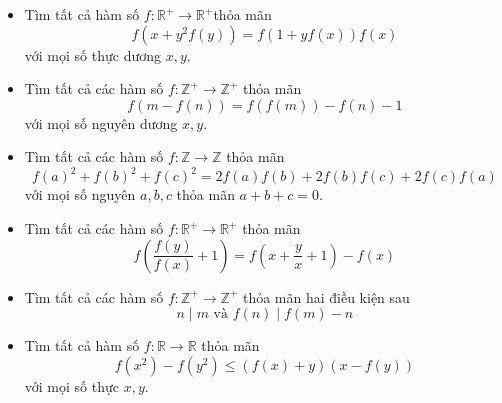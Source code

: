 \documentclass[11pt]{scrartcl}
\begin{document}
\begin{itemize}[label=, leftmargin=0em, itemsep=0.5em]
\begin{sol}
        
        
       \end{sol}
    \item \begin{bt}
        Tìm tất cả hàm số $f: \mathbb{R}^{+} \rightarrow \mathbb{R}^{+}$thỏa mãn
        $$
        f\left(x+y^2 f(y)\right)=f(1+y f(x)) f(x)
        $$
        với mọi số thực dương $x, y$.
   \end{bt}
   
   \item \begin{bt}
    Tìm tất cả các hàm số $f: \mathbb{Z}^+ \to \mathbb{Z}^+$ thỏa mãn
    \[
       f(m - f(n))  = f(f(m)) - f(n) -1
    \]
    với mọi số nguyên dương $x,y$.
\end{bt}
\item \begin{bt}
    Tìm tất cả các hàm số $f: \mathbb{Z} \to \mathbb{Z}$ thỏa mãn
    \[
      f(a)^2 + f(b)^2 + f(c)^2 = 2f(a)f(b) + 2f(b)f(c) + 2f(c)f(a)
    \]
    với mọi số nguyên $a,b,c$ thỏa mãn $a + b + c = 0$.
\end{bt}



    \item \begin{bt}
        Tìm tất cả các hàm số $f: \mathbb{R}^+\rightarrow \mathbb{R}^+$ thỏa mãn
        \[f\left(\frac{f(y)}{f(x)}+1\right)=f\left(x+\frac{y}{x}+1\right)-f(x)\]
    \end{bt}


    \item \begin{bt}
        Tìm tất cả các hàm số $f: \mathbb{Z}^+\rightarrow \mathbb{Z}^+$ thỏa mãn hai điều kiện sau
        \[
            n \mid m \text{ và }f(n) \mid f(m) - n
        \]
    \end{bt}
    
    \item \begin{btvn}
        Tìm tất cả hàm số $f: \mathbb{R} \rightarrow \mathbb{R}$ thỏa mãn
        $$
        f\left(x^2\right)-f\left(y^2\right) \leq(f(x)+y)(x-f(y))
        $$
        với mọi số thực $x, y$.
    \end{btvn}


\end{itemize}
\end{document}
